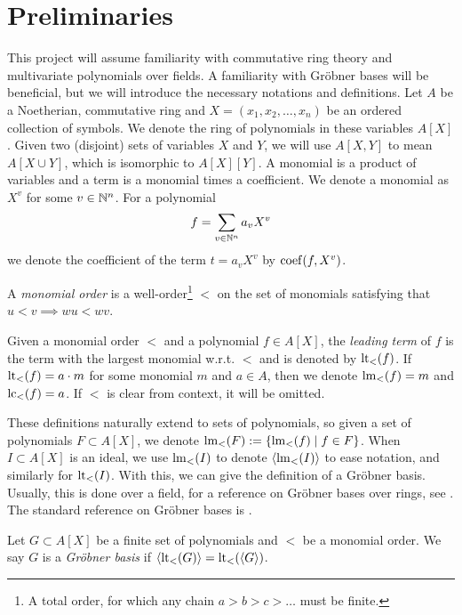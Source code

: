 \section{Preliminaries}
This project will assume familiarity with commutative ring theory and multivariate polynomials over fields. A familiarity with Gröbner bases will be beneficial, but we will introduce the necessary notations and definitions. Let $A$ be a Noetherian, commutative ring and $X = (x_{1}, x_{2}, \dots, x_{n})$ be an ordered collection of symbols. We denote the ring of polynomials in these variables $A[X]$. Given two (disjoint) sets of variables $X$ and $Y$, we will use $A[X, Y]$ to mean $A[X \cup Y]$, which is isomorphic to $A[X][Y]$. A monomial is a product of variables and a term is a monomial times a coefficient. We denote a monomial as $X^{v}$ for some $v \in \mathbb{N}^{n}$. For a polynomial \[f = \sum_{v \in \mathbb{N}^{n}} a_{v}X^{v}\] we denote the coefficient of the term $t = a_{v}X^{v}$ by $\operatorname{coef}(f, X^{v})$.

\begin{definition}
  A \textit{monomial order} is a well-order\footnote{A total order, for which any chain $a > b > c > \dots$ must be finite.} $<$ on the set of monomials satisfying that $u < v \implies wu < wv$.

  Given a monomial order $<$ and a polynomial $f \in A[X]$, the \textit{leading term} of $f$ is the term with the largest monomial w.r.t. $<$ and is denoted by $\operatorname{lt}_{<}(f)$. If $\operatorname{lt}_{<}(f) = a\cdot m$ for some monomial $m$ and $a \in A$, then we denote $\operatorname{lm}_{<}(f) = m$ and $\operatorname{lc}_{<}(f) = a$. If $<$ is clear from context, it will be omitted.
\end{definition}

These definitions naturally extend to sets of polynomials, so given a set of polynomials $F \subset A[X]$, we denote $\operatorname{lm}_{<}(F) := \{\operatorname{lm}_{<}(f) \mid f \in F\}$. When $I \subset A[X]$ is an ideal, we use $\operatorname{lm}_{<}(I)$ to denote $\langle \operatorname{lm}_{<}(I) \rangle$ to ease notation, and similarly for $\operatorname{lt}_{<}(I)$. With this, we can give the definition of a Gröbner basis. Usually, this is done over a field, for a reference on Gröbner bases over rings, see \cite{loustaunau1994introduction}. The standard reference on Gröbner bases is \cite{IVA}.

\begin{definition}
  Let $G \subset A[X]$ be a finite set of polynomials and $<$ be a monomial order. We say $G$ is a \textit{Gröbner basis} if
  $\langle \operatorname{lt}_{<}(G) \rangle = \operatorname{lt}_{<}(\langle G \rangle )$.
\end{definition}

